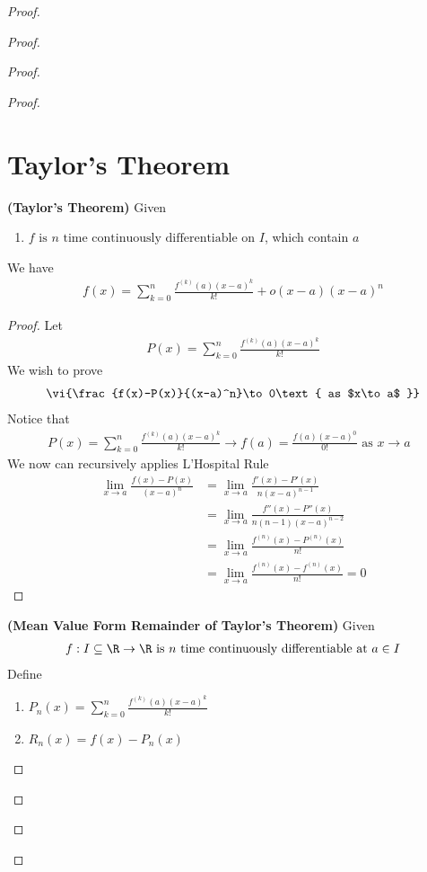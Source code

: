 \documentclass{report}
\begin{document}
\begin{proof}
\begin{proof}
\begin{proof}
\begin{proof}
\section{Taylor's Theorem}
\begin{theorem}
\label{6.5.1}
\textbf{(Taylor's Theorem)} Given 
\begin{enumerate}[label=(\alph*)]
  \item $f\text{ is $n$ time continuously differentiable on }I$, which contain $a$
\end{enumerate}
We have
\begin{align*}
f(x)=\sum_{k=0}^n \frac{f^{(k)}(a)(x-a)^k}{k!}+o(x-a)(x-a)^n
\end{align*}
\end{theorem}
\begin{proof}
Let 
 \begin{align*}
P(x)=\sum_{k=0}^n \frac{f^{(k)}(a)(x-a)^k}{k!}
\end{align*}
We wish to prove 
\begin{align*}
\vi{\frac{f(x)-P(x)}{(x-a)^n}\to 0\text{ as $x\to a$ }}
\end{align*}
Notice that 
\begin{align*}
P(x)=\sum_{k=0}^n \frac{f^{(k)}(a)(x-a)^k}{k!}\to f(a)=\frac{f(a)(x-a)^0}{0!}\text{ as $x\to a$ }
\end{align*}
We now can recursively applies L'Hospital Rule
\begin{align*}
\lim_{x \to a} \frac{f(x)-P(x)}{(x-a)^n}&= \lim_{x \to a} \frac{f'(x)-P'(x)}{n (x-a)^{n-1}}\\
&=\lim_{x \to a}\frac{f''(x)-P''(x)}{n(n-1)(x-a)^{n-2}}\\
&=\lim_{x \to a}\frac{f^{(n)}(x)-P^{(n)}(x)}{n!}\\
&=\lim_{x\to a}\frac{f^{(n)}(x)-f^{(n)}(x)}{n!}=0
\end{align*}
\end{proof}
\begin{theorem}
\label{6.5.2}
\textbf{(Mean Value Form Remainder of Taylor's Theorem)} Given 
\begin{align*}
f:I\subseteq \R\rightarrow \R\text{ is $n$ time continuously differentiable at $a\in I$}
\end{align*}
Define 
\begin{enumerate}[label=(\alph*)]
  \item $P_n(x)=\sum_{k=0}^n \frac{f^{(k)}(a) (x-a)^k}{k!}$ 
  \item  $R_n(x)=f(x)-P_n(x)$
\end{enumerate}

\end{theorem}
\end{proof}
\end{proof}
\end{proof}
\end{proof}
\end{document}

